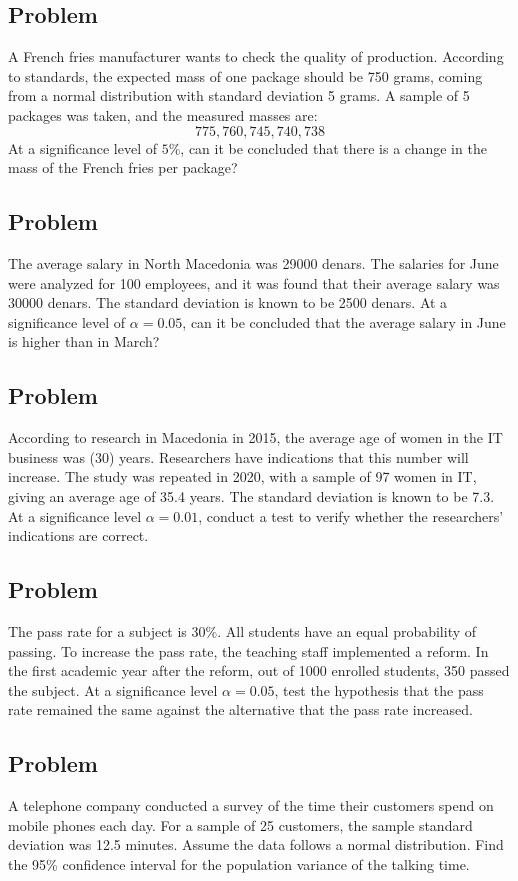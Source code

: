 \documentclass[a4paper, 12pt]{article}
\begin{document}
\subsection{Problem}
A French fries manufacturer wants to check the quality of production. According to standards, the expected mass of one package should be 750 grams, coming from a normal distribution with standard deviation 5 grams. A sample of 5 packages was taken, and the measured masses are:
\[
775, 760, 745, 740, 738
\]
At a significance level of $5\%$, can it be concluded that there is a change in the mass of the French fries per package?

\subsection{Problem}
The average salary in North Macedonia was 29000 denars. The salaries for June were analyzed for 100 employees, and it was found that their average salary was 30000 denars. The standard deviation is known to be 2500 denars.
At a significance level of $\alpha = 0.05$, can it be concluded that the average salary in June is higher than in March?

\subsection{Problem}
According to research in Macedonia in 2015, the average age of women in the IT business was (30) years. Researchers have indications that this number will increase.
The study was repeated in 2020, with a sample of 97 women in IT, giving an average age of 35.4 years. The standard deviation is known to be 7.3.
At a significance level $\alpha = 0.01$, conduct a test to verify whether the researchers' indications are correct.

\subsection{Problem}
The pass rate for a subject is $30\%$. All students have an equal probability of passing. To increase the pass rate, the teaching staff implemented a reform. In the first academic year after the reform, out of 1000 enrolled students, 350 passed the subject.
At a significance level $\alpha = 0.05$, test the hypothesis that the pass rate remained the same against the alternative that the pass rate increased.

\subsection{Problem}
A telephone company conducted a survey of the time their customers spend on mobile phones each day. For a sample of 25 customers, the sample standard deviation was 12.5 minutes. Assume the data follows a normal distribution.
Find the 95\% confidence interval for the population variance of the talking time.
\end{document}
